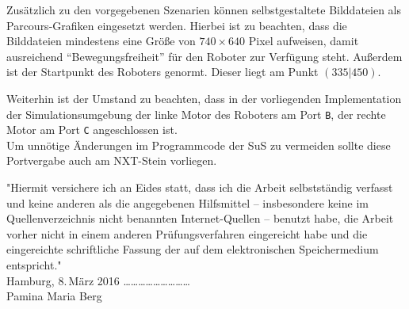 \documentclass[paper=a4, DIV=calc, BCOR=12mm, twoside=on, onecolumn=on, open = right, titlepage =on, parskip =half-, headsepline = on, footsepline = off, chapterprefix = off, appendixprefix = on, fontsize = 12pt, numbers = noenddot, abstract = on]{scrbook}
\begin{document}

Zusätzlich zu den vorgegebenen Szenarien können selbstgestaltete Bilddateien als Parcours-Grafiken eingesetzt werden. Hierbei ist zu beachten, dass die Bilddateien mindestens eine Größe von $740 \times 640$ Pixel aufweisen, damit ausreichend "`Bewegungsfreiheit"' für den Roboter zur Verfügung steht. Außerdem ist der Startpunkt des Roboters genormt. Dieser liegt am Punkt $\left( 335 \vert 450 \right)$.


Weiterhin ist der Umstand zu beachten, dass in der vorliegenden Implementation der Simulationsumgebung der linke Motor des Roboters am Port \texttt{B}, der rechte Motor am Port \texttt{C} angeschlossen ist.\\
Um unnötige Änderungen im Programmcode der SuS zu vermeiden sollte diese Portvergabe auch am NXT-Stein vorliegen.

\cleardoublepage
\newpage
\thispagestyle{empty}
\vspace*{\fill}
"Hiermit versichere ich an Eides statt, dass ich die Arbeit selbstständig verfasst und keine anderen als die angegebenen Hilfsmittel – insbesondere keine im Quellenverzeichnis nicht benannten Internet-Quellen – benutzt habe, die Arbeit vorher nicht in einem anderen Prüfungsverfahren eingereicht habe und die eingereichte schriftliche Fassung der auf dem elektronischen Speichermedium entspricht."\\

Hamburg, 8.\,März 2016 \hspace*{\fill} \dots \dots \dots \dots \dots \dots \dots \dots \dots\\
\hspace*{\fill} Pamina Maria Berg \quad $\,$
\end{document}
